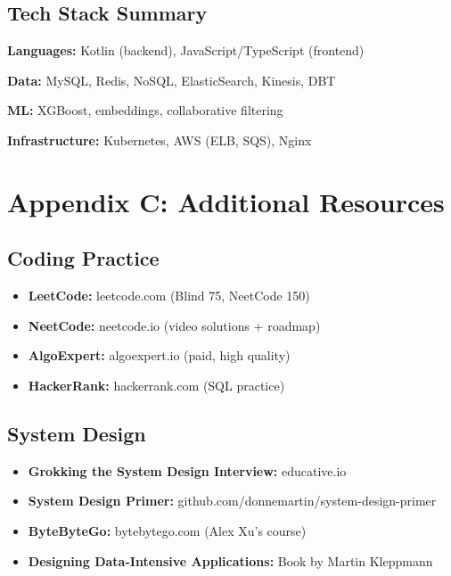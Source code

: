 \documentclass[11pt,letterpaper]{article}
\begin{document}
\subsection{Tech Stack Summary}

\textbf{Languages:} Kotlin (backend), JavaScript/TypeScript (frontend)

\textbf{Data:} MySQL, Redis, NoSQL, ElasticSearch, Kinesis, DBT

\textbf{ML:} XGBoost, embeddings, collaborative filtering

\textbf{Infrastructure:} Kubernetes, AWS (ELB, SQS), Nginx

\section{Appendix C: Additional Resources}

\subsection{Coding Practice}

\begin{itemize}
    \item \textbf{LeetCode:} leetcode.com (Blind 75, NeetCode 150)
    \item \textbf{NeetCode:} neetcode.io (video solutions + roadmap)
    \item \textbf{AlgoExpert:} algoexpert.io (paid, high quality)
    \item \textbf{HackerRank:} hackerrank.com (SQL practice)
\end{itemize}

\subsection{System Design}

\begin{itemize}
    \item \textbf{Grokking the System Design Interview:} educative.io
    \item \textbf{System Design Primer:} github.com/donnemartin/system-design-primer
    \item \textbf{ByteByteGo:} bytebytego.com (Alex Xu's course)
    \item \textbf{Designing Data-Intensive Applications:} Book by Martin Kleppmann
\end{itemize}
\end{document}
